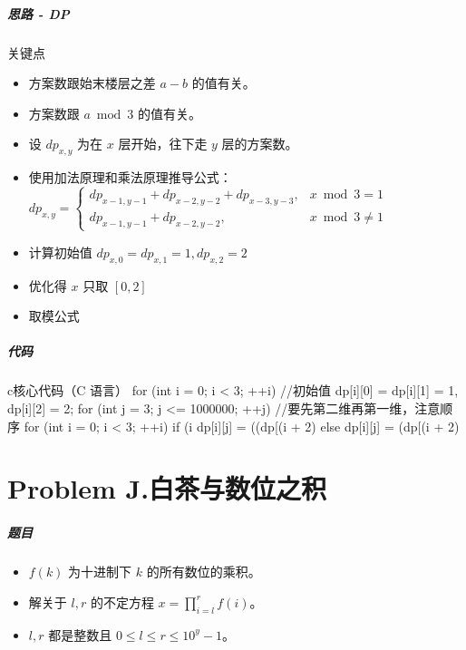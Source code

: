 \documentclass[
     aspectratio=169,                   %
]{beamer}
\begin{document}
\begin{frame}
	\frametitle{思路 - DP}
	 \begin{exampleblock}{关键点}
		 \begin{itemize}
			\item 方案数跟始末楼层之差 $a-b$ 的值有关。
			\item 方案数跟 $a\bmod 3$ 的值有关。
		\end{itemize}
	\end{exampleblock}
	\begin{itemize}
		\item 设 $dp_{x,y}$ 为在 $x$ 层开始，往下走 $y$ 层的方案数。
		\item 使用加法原理和乘法原理推导公式： $dp_{x,y}=\begin{cases}
			dp_{x-1,y-1}+dp_{x-2,y-2}+dp_{x-3,y-3},&x\bmod 3=1\\
			dp_{x-1,y-1}+dp_{x-2,y-2},&x\bmod 3\neq1
			\end{cases}$
		\item 计算初始值 $dp_{x,0}=dp_{x,1}=1,dp_{x,2}=2$ 
		\item 优化得 $x$ 只取 $[0,2]$ 
		\item 取模公式
	\end{itemize}
\end{frame}

\begin{frame}[fragile]
	\frametitle{代码}
	 \begin{codeblock}{c}{核心代码（C 语言）}
for (int i = 0; i < 3; ++i) //初始值
    dp[i][0] = dp[i][1] = 1, dp[i][2] = 2;
for (int j = 3; j <= 1000000; ++j) //要先第二维再第一维，注意顺序
{
    for (int i = 0; i < 3; ++i)
    {
        if (i %
            dp[i][j] = ((dp[(i + 2) %
        else
            dp[i][j] = (dp[(i + 2) %
    }
}
\end{codeblock}
\end{frame}


\part{Problem J.白茶与数位之积}
\begin{frame}
	\frametitle{题目}
	
	\begin{itemize}
		\item $f(k)$ 为十进制下 $k$ 的所有数位的乘积。
		\item 解关于 $l,r$ 的不定方程 $x=\prod_{i=l}^{r}{f(i)}$。
		\item $l,r$ 都是整数且 $0\leq l \leq r \leq 10^y -1$。
	\end{itemize}
	
\end{frame}
\end{document}
